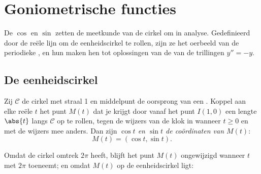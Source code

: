 \chapter{Goniometrische functies}\label{ch:g12:trigo}

De  $\cos$ en $\sin$ zetten de meetkunde van de cirkel om in analyse.
Gedefinieerd door de reële lijn om de eenheidscirkel te rollen, zijn ze het
oerbeeld van de periodieke , en hun  maken hen tot
oplossingen van de  van de trillingen $y'' = -y$.

\section{De eenheidscirkel}

\begin{definition}\label{def:g12:trigo:cossin}
Zij $\mathcal{C}$ de cirkel met straal 1 en middelpunt de oorsprong van een
. Koppel aan elke reële $t$ het punt $M(t)$ dat je
krijgt door vanaf het punt $I(1,0)$ een lengte $\abs{t}$ langs
$\mathcal{C}$ op te rollen, tegen de wijzers van de klok in wanneer
$t \geq 0$ en met de wijzers mee anders. Dan zijn \emph{$\cos t$ en $\sin t$
de coördinaten van $M(t)$}:
\[
M(t) = (\cos t, \sin t).
\]
\end{definition}

\begin{omfigure}
\end{omfigure}

Omdat de cirkel omtrek $2\pi$ heeft, blijft het punt $M(t)$ ongewijzigd
wanneer $t$ met $2\pi$ toeneemt; en omdat $M(t)$ op de eenheidscirkel ligt:

